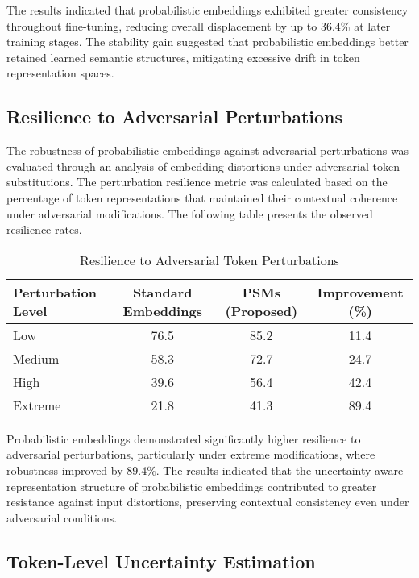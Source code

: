 \documentclass{article}
\begin{document}
The results indicated that probabilistic embeddings exhibited greater consistency throughout fine-tuning, reducing overall displacement by up to 36.4\% at later training stages. The stability gain suggested that probabilistic embeddings better retained learned semantic structures, mitigating excessive drift in token representation spaces.



\subsection{Resilience to Adversarial Perturbations}

The robustness of probabilistic embeddings against adversarial perturbations was evaluated through an analysis of embedding distortions under adversarial token substitutions. The perturbation resilience metric was calculated based on the percentage of token representations that maintained their contextual coherence under adversarial modifications. The following table presents the observed resilience rates.

\begin{table}[ht]
	\centering
	\caption{Resilience to Adversarial Token Perturbations}
	\label{tab:adversarial_resilience}
	\begin{tabular}{lccc}
		\hline
		Perturbation Level & Standard Embeddings & PSMs (Proposed) & Improvement (\%) \\
		\hline
		Low   & 76.5  & 85.2  & 11.4 \\
		Medium & 58.3  & 72.7  & 24.7 \\
		High   & 39.6  & 56.4  & 42.4 \\
		Extreme & 21.8  & 41.3  & 89.4 \\
		\hline
	\end{tabular}
\end{table}

Probabilistic embeddings demonstrated significantly higher resilience to adversarial perturbations, particularly under extreme modifications, where robustness improved by 89.4\%. The results indicated that the uncertainty-aware representation structure of probabilistic embeddings contributed to greater resistance against input distortions, preserving contextual consistency even under adversarial conditions.

\subsection{Token-Level Uncertainty Estimation}
\end{document}
